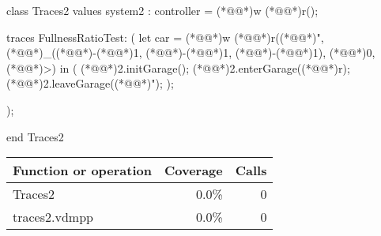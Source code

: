 \documentclass[a4paper]{article}
\begin{document}
\title{}
\author{}
\begin{vdm_al}
class Traces2
values 
    system2 : controller = (*@@*)w (*@@*)r();

traces
FullnessRatioTest:
(
    let car = (*@@*)w (*@@*)r((*@@*)", (*@@*)_((*@\vdmnotcovered{}@*)-(*@\vdmnotcovered{}@*)1, (*@\vdmnotcovered{}@*)-(*@\vdmnotcovered{}@*)1, (*@\vdmnotcovered{}@*)-(*@\vdmnotcovered{}@*)1), (*@\vdmnotcovered{}@*)0, (*@@*)>) in
    (
        (*@@*)2.initGarage();
        (*@@*)2.enterGarage((*@@*)r);
        (*@@*)2.leaveGarage((*@@*)");
    );
    
);

end Traces2
\end{vdm_al}
\bigskip
\begin{longtable}{|l|r|r|}
\hline
Function or operation & Coverage & Calls \\
\hline
\hline
Traces2 & 0.0\% & 0 \\
\hline
\hline
traces2.vdmpp & 0.0\% & 0 \\
\hline
\end{longtable}
\end{document}

